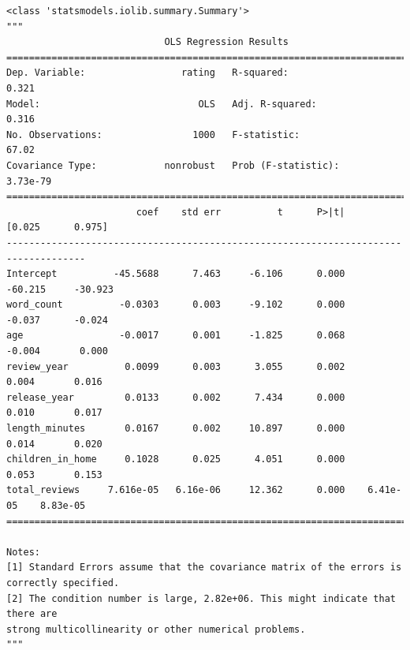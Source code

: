 \documentclass[
  letterpaper,
]{krantz}
\begin{document}
\begin{verbatim}
<class 'statsmodels.iolib.summary.Summary'>
"""
                            OLS Regression Results                            
==============================================================================
Dep. Variable:                 rating   R-squared:                       0.321
Model:                            OLS   Adj. R-squared:                  0.316
No. Observations:                1000   F-statistic:                     67.02
Covariance Type:            nonrobust   Prob (F-statistic):           3.73e-79
====================================================================================
                       coef    std err          t      P>|t|      [0.025      0.975]
------------------------------------------------------------------------------------
Intercept          -45.5688      7.463     -6.106      0.000     -60.215     -30.923
word_count          -0.0303      0.003     -9.102      0.000      -0.037      -0.024
age                 -0.0017      0.001     -1.825      0.068      -0.004       0.000
review_year          0.0099      0.003      3.055      0.002       0.004       0.016
release_year         0.0133      0.002      7.434      0.000       0.010       0.017
length_minutes       0.0167      0.002     10.897      0.000       0.014       0.020
children_in_home     0.1028      0.025      4.051      0.000       0.053       0.153
total_reviews     7.616e-05   6.16e-06     12.362      0.000    6.41e-05    8.83e-05
====================================================================================

Notes:
[1] Standard Errors assume that the covariance matrix of the errors is correctly specified.
[2] The condition number is large, 2.82e+06. This might indicate that there are
strong multicollinearity or other numerical problems.
"""
\end{verbatim}
\end{document}

